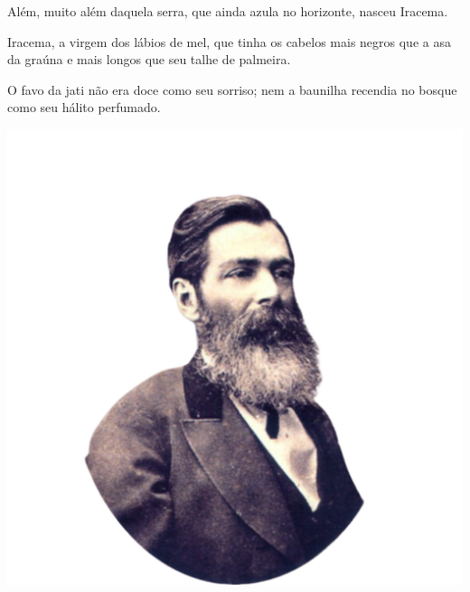 \begin{myquote}


\begin{minipage}{0.6\textwidth}
Além, muito além daquela serra, que ainda azula no
horizonte, nasceu Iracema.

Iracema, a virgem dos lábios de mel, que tinha os
cabelos mais negros que a asa da graúna e mais longos
que seu talhe de palmeira.

O favo da jati não era doce como seu sorriso; nem
a baunilha recendia no bosque como seu hálito perfumado.
\end{minipage}
\hfill
\begin{minipage}{0.4\textwidth}
  \centering
  \includegraphics[width=\textwidth]{./imgSAEB_7_POR/media/image52.png}
\end{minipage}


\end{myquote}
\pagebreak

